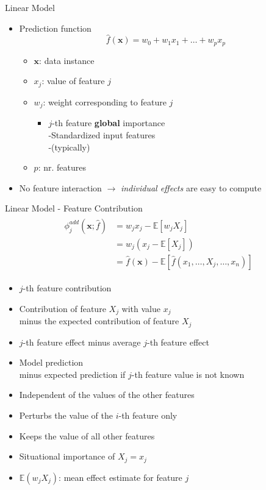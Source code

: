 \begin{frame}{Linear Model}
	\begin{itemize}\setlength\itemsep{2em}
		\item<1-> Prediction function
		\begin{equation}
			\hat{f}(\bm{x})=w_0+w_1 x_{1} + \dots + w_p x_ p
		\end{equation}
		\begin{itemize}
			\item $\bm{x}$: data instance
			\item $x_j$: value of feature $j$
			\item $w_j$: weight corresponding to feature $j$
			\begin{itemize}
				\item $j$-th feature \textbf{global} importance 
				\\-Standardized input features
				\\-(typically) 
			\end{itemize}
			\item $p$: nr. features
		\end{itemize}
		\item<2-> No feature interaction $\rightarrow$ \emph{individual effects} are easy to compute
	\end{itemize}
\end{frame}
\begin{frame}{Linear Model - Feature Contribution}
	\begin{align}
		\begin{split}
			\phi^{add}_j\left(\bm{x};\hat{f}\right)
			&=w_{j}x_j-\mathbb{E}\left[w_{j}X_{j}\right]\\
			&=w_{j}\left(x_j-\mathbb{E}\left[X_{j}\right]\right)\\
			&=\hat{f}(\bm{x}) - \mathbb{E}\left[\hat{f}(x_1, \dots, X_{j}, \dots, x_n)\right]
		\end{split}
	\end{align}
	\begin{itemize}
		\item $j$-th feature contribution
		\item Contribution of feature $X_j$ with value $x_j$
		\\minus the expected contribution of feature $X_j$
		\item $j$-th feature effect minus average $j$-th feature effect
		\item Model prediction
		\\minus expected prediction if $j$-th feature value is not known
		\item Independent of the values of the other features
		\item Perturbs the value of the $i$-th feature only
		\item Keeps the value of all other features
		\item Situational importance of $X_j = x_j$~\cite{achen1982interpreting}
		\item $\mathbb{E}(w_{j}X_{j})$: mean effect estimate for feature $j$
	\end{itemize}
\end{frame}
